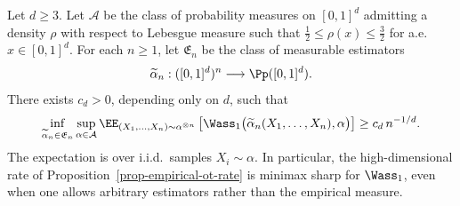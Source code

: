 \begin{prop}\label{prop-minimax-lower-w1-density}
	Let \(d\geq3\). Let \(\mathcal A\) be the class of probability measures on \([0,1]^d\) admitting a density \(\rho\) with respect to Lebesgue measure such that
	$\frac12\leq \rho(x)\leq \frac32$ for a.e.\ $x\in[0,1]^d$.
	For each \(n\geq1\), let \(\mathfrak E_n\) be the class of measurable estimators
	\[
		\widetilde\alpha_n:([0,1]^d)^n\longrightarrow\Pp([0,1]^d).
	\]
	There exists \(c_d>0\), depending only on \(d\), such that
	\[
		\inf_{\widetilde\alpha_n\in\mathfrak E_n}
		\sup_{\alpha\in\mathcal A}
		\EE_{(X_1,\ldots,X_n)\sim\alpha^{\otimes n}}
		\left[
			\Wass_1\big(\widetilde\alpha_n(X_1,\ldots,X_n),\alpha\big)
		\right]
		\geq
		c_d\,n^{-1/d}.
	\]
	The expectation is over i.i.d.\ samples \(X_i\sim\alpha\). In particular, the high-dimensional rate of Proposition~\ref{prop-empirical-ot-rate} is minimax sharp for \(\Wass_1\), even when one allows arbitrary estimators rather than the empirical measure.
\end{prop}

